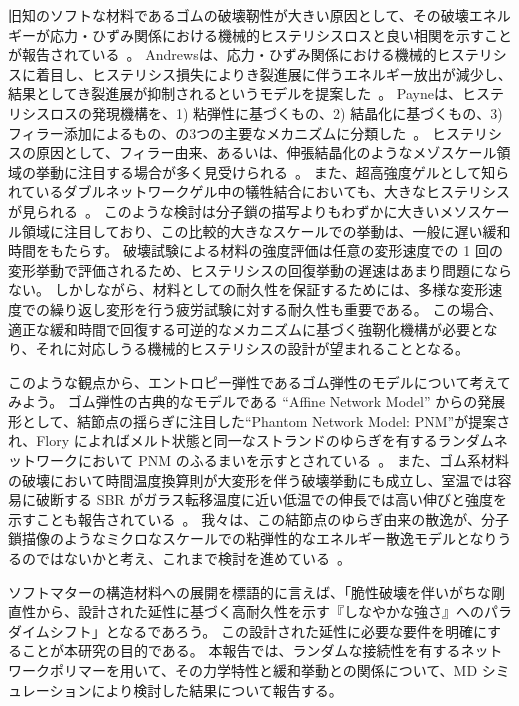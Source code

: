 \documentclass[uplatex,dvipdfmx,a4paper,10pt]{jsarticle}
\makeatletter
\def\subsection{\@startsection{subsection}{2}{\z@}{0.2\Cvs \@plus.5\Cdp \@minus.2\Cdp}{0.1\Cvs \@plus.3\Cdp}{\reset@font\normalsize\bfseries}}
\makeatother
\begin{document}
旧知のソフトな材料であるゴムの破壊靭性が大きい原因として、その破壊エネルギーが応力・ひずみ関係における機械的ヒステリシスロスと良い相関を示すことが報告されている~\cite{payne1}。
Andrewsは、応力・ひずみ関係における機械的ヒステリシスに着目し、ヒステリシス損失によりき裂進展に伴うエネルギー放出が減少し、結果としてき裂進展が抑制されるというモデルを提案した~\cite{andrews}。
Payneは、ヒステリシスロスの発現機構を、1) 粘弾性に基づくもの、2) 結晶化に基づくもの、3) フィラー添加によるもの、の3つの主要なメカニズムに分類した~\cite{payne2}。
ヒステリシスの原因として、フィラー由来、あるいは、伸張結晶化のようなメゾスケール領域の挙動に注目する場合が多く見受けられる~\cite{zhang}。
また、超高強度ゲルとして知られているダブルネットワークゲル中の犠牲結合においても、大きなヒステリシスが見られる~\cite{gong}。
このような検討は分子鎖の描写よりもわずかに大きいメソスケール領域に注目しており、この比較的大きなスケールでの挙動は、一般に遅い緩和時間をもたらす。
破壊試験による材料の強度評価は任意の変形速度での 1 回の変形挙動で評価されるため、ヒステリシスの回復挙動の遅速はあまり問題にならない。
しかしながら、材料としての耐久性を保証するためには、多様な変形速度での繰り返し変形を行う疲労試験に対する耐久性も重要である。
この場合、適正な緩和時間で回復する可逆的なメカニズムに基づく強靭化機構が必要となり、それに対応しうる機械的ヒステリシスの設計が望まれることとなる。

このような観点から、エントロピー弾性であるゴム弾性のモデルについて考えてみよう。
ゴム弾性の古典的なモデルである ``Affine Network Model'' からの発展形として、結節点の揺らぎに注目した``Phantom Network Model: PNM''が提案され、Flory によればメルト状態と同一なストランドのゆらぎを有するランダムネットワークにおいて PNM のふるまいを示すとされている~\cite{flory}。
また、ゴム系材料の破壊において時間温度換算則が大変形を伴う破壊挙動にも成立し、室温では容易に破断する SBR がガラス転移温度に近い低温での伸長では高い伸びと強度を示すことも報告されている~\cite{smith}。
我々は、この結節点のゆらぎ由来の散逸が、分子鎖描像のようなミクロなスケールでの粘弾性的なエネルギー散逸モデルとなりうるのではないかと考え、これまで検討を進めている~\cite{sasaki}。








ソフトマターの構造材料への展開を標語的に言えば、「脆性破壊を伴いがちな剛直性から、設計された延性に基づく高耐久性を示す『しなやかな強さ』へのパラダイムシフト」となるであろう。
この設計された延性に必要な要件を明確にすることが本研究の目的である。
本報告では、ランダムな接続性を有するネットワークポリマーを用いて、その力学特性と緩和挙動との関係について、MD シミュレーションにより検討した結果について報告する。
\end{document}
